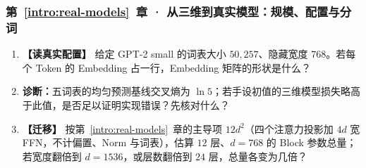 \subsubsection*{第~\ref*{intro:real-models}~章 · 从三维到真实模型：规模、配置与分词}
\begin{enumerate}[label={},leftmargin=4.8em,itemsep=4pt]
\item[\textbf{C-090.}] \leavevmode{}\label{exercise:C-090}\label{exercise:real-embedding-shape}\textbf{【读真实配置】} 给定 GPT-2 small 的词表大小 $50{,}257$、隐藏宽度 $768$。若每个 Token 的 Embedding 占一行，Embedding 矩阵的形状是什么？
\item[\textbf{C-091.}] \leavevmode{}\label{exercise:C-091}\label{exercise:uniform-baseline-interpretation}\textbf{诊断：}五词表的均匀预测基线交叉熵为 $\ln5$；若手设初值的三维模型损失略高于此值，是否足以证明实现错误？先核对什么？
\item[\textbf{C-092.}] \leavevmode{}\label{exercise:C-092}\label{exercise:compute-token-budget}\textbf{【迁移】} 按第~\ref*{intro:real-models}~章的主导项 $12d^2$（四个注意力投影加 $4d$ 宽 FFN，不计偏置、Norm 与词表），估算 $12$ 层、$d=768$ 的 Block 参数总量；若宽度翻倍到 $d=1536$，或层数翻倍到 $24$ 层，总量各变为几倍？
\end{enumerate}
